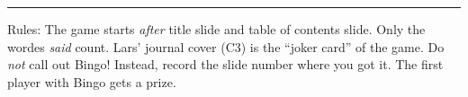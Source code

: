 \documentclass[a4paper, twocolumn]{article}
\newcounter{myletter}
\begin{document}
\begin{figure}[h!]
\begin{center}
  \end{center}
\end{figure}

\hrule
\vspace{2pt}
   \footnotesize{
     Rules: The game starts \emph{after} title slide and table of contents 
     slide. Only the wordes \emph{said} count. Lars' journal cover (C3) is
     the ``joker card'' of the game. Do \emph{not} call out Bingo! Instead,
     record the slide number where you got it. The first player with Bingo gets a prize.
   }
\end{document}

